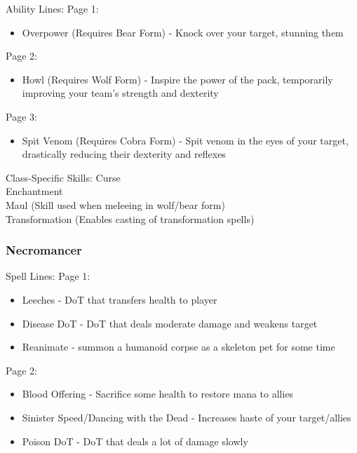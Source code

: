 \documentclass{article}
\begin{document}
Ability Lines:
Page 1:
\begin{itemize}
    \item Overpower (Requires Bear Form) - Knock over your target, stunning them
    
\end{itemize}

Page 2:
\begin{itemize}
    \item Howl (Requires Wolf Form) - Inspire the power of the pack, temporarily improving your team's strength and dexterity
\end{itemize}

Page 3:
\begin{itemize}
    \item Spit Venom (Requires Cobra Form) - Spit venom in the eyes of your target, drastically reducing their
        dexterity and reflexes
\end{itemize}



Class-Specific Skills:
Curse\\
Enchantment\\
Maul (Skill used when meleeing in wolf/bear form)\\
Transformation (Enables casting of transformation spells)\\


\subsubsection{Necromancer}
Spell Lines:
Page 1:
\begin{itemize}
    \item Leeches - DoT that transfers health to player
    \item Disease DoT - DoT that deals moderate damage and weakens target
    \item Reanimate - summon a humanoid corpse as a skeleton pet for some time
    
\end{itemize}

Page 2:
\begin{itemize}
    \item Blood Offering - Sacrifice some health to restore mana to allies
    \item Sinister Speed/Dancing with the Dead - Increases haste of your target/allies
    \item Poison DoT - DoT that deals a lot of damage slowly
    
\end{itemize}
\end{document}
